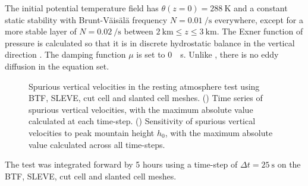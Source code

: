 The initial potential temperature field has $\theta(z = 0) = \SI{288}{\kelvin}$ and a constant static stability with Brunt-V\"ais\"al\"a frequency $N = \SI{0.01}{\per\second}$ everywhere, except for a more stable layer of $N = \SI{0.02}{\per\second}$ between $\SI{2}{\kilo\meter} \leq z \leq \SI{3}{\kilo\meter}$.  The Exner function of pressure is calculated so that it is in discrete hydrostatic balance in the vertical direction \citep{weller-shahrokhi2014}.  The damping function \(\mu\) is set to \SI{0}{\per\second}.  Unlike \citet{klemp2011}, there is no eddy diffusion in the equation set.

\begin{figure}
	\centering
	\begin{subfigure}{\textwidth}
		\centering
		
		\label{fig:slanted:resting:w:timeseries}
		\label{fig:slanted:resting:w:max}
	\end{subfigure}
	\caption{Spurious vertical velocities in the resting atmosphere test using BTF, SLEVE, cut cell and slanted cell meshes.
	() Time series of spurious vertical velocities, with the maximum absolute value calculated at each time-step. 
	() Sensitivity of spurious vertical velocities to peak mountain height $h_0$, with the maximum absolute value calculated across all time-steps.
	}
	\label{fig:slanted:resting:w}
\end{figure}

The test was integrated forward by 5 hours using a time-step of $\Delta t = \SI{25}{\second}$ on the BTF, SLEVE, cut cell and slanted cell meshes.


